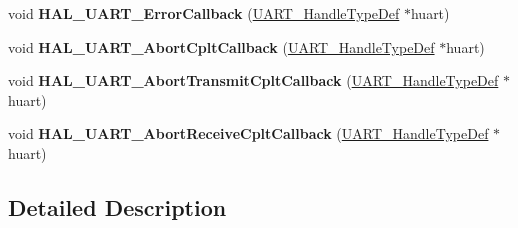 \begin{DoxyCompactItemize}
\mbox{\label{group___u_a_r_t___exported___functions___group2_ga0e0456ea96d55db31de947fb3e954f18}} 
void {\bfseries H\+A\+L\+\_\+\+U\+A\+R\+T\+\_\+\+Error\+Callback} (\hyperlink{struct_u_a_r_t___handle_type_def}{U\+A\+R\+T\+\_\+\+Handle\+Type\+Def} $\ast$huart)
\item 
\mbox{\label{group___u_a_r_t___exported___functions___group2_gacdcb274a742093c45869f2cfbb0a8b09}} 
void {\bfseries H\+A\+L\+\_\+\+U\+A\+R\+T\+\_\+\+Abort\+Cplt\+Callback} (\hyperlink{struct_u_a_r_t___handle_type_def}{U\+A\+R\+T\+\_\+\+Handle\+Type\+Def} $\ast$huart)
\item 
\mbox{\label{group___u_a_r_t___exported___functions___group2_gacf94995fb9986930151f3c5586d37e5c}} 
void {\bfseries H\+A\+L\+\_\+\+U\+A\+R\+T\+\_\+\+Abort\+Transmit\+Cplt\+Callback} (\hyperlink{struct_u_a_r_t___handle_type_def}{U\+A\+R\+T\+\_\+\+Handle\+Type\+Def} $\ast$huart)
\item 
\mbox{\label{group___u_a_r_t___exported___functions___group2_ga0f9d15c5ae7b69f09e0ee5f2461e7e7a}} 
void {\bfseries H\+A\+L\+\_\+\+U\+A\+R\+T\+\_\+\+Abort\+Receive\+Cplt\+Callback} (\hyperlink{struct_u_a_r_t___handle_type_def}{U\+A\+R\+T\+\_\+\+Handle\+Type\+Def} $\ast$huart)
\end{DoxyCompactItemize}


\subsection{Detailed Description}
